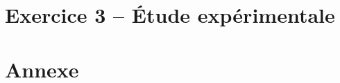 \documentclass[11pt,a4paper,sans]{report}
\begin{document}
	\newpage
	\chapter{Exercice 3 – Étude expérimentale}

	\newpage
	
	

	\newpage
	\listoffigures



	\newpage
	\chapter{Annexe}
\end{document}
